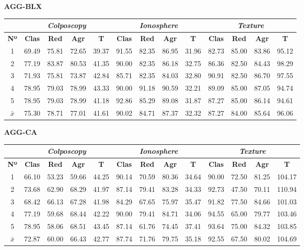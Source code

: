 \documentclass[12pt]{article}
\begin{document}
\textbf{AGG-BLX}

\begin{table}[ht!]
\begin{tabular}{ccccc|cccc|cccc}
\centering
 & \multicolumn{4}{c}{\textit{Colposcopy}} & \multicolumn{4}{c}{\textit{Ionosphere}} & \multicolumn{4}{c}{\textit{Texture}} \\ \hline
\textbf{Nº} & \textbf{Clas} & \textbf{Red} & \textbf{Agr} & \textbf{T} & \textbf{Clas} & \textbf{Red} & \textbf{Agr} & \textbf{T} & \textbf{Clas} & \textbf{Red} & \textbf{Agr} & \textbf{T} \\ \hline
1 & 69.49 & 75.81 & 72.65 & 39.37  & 91.55 & 82.35 & 86.95 & 31.96  & 82.73 & 85.00 & 83.86 & 95.12 \\
2 & 77.19 & 83.87 & 80.53 & 41.35  & 90.00 & 82.35 & 86.18 & 32.75  & 86.36 & 82.50 & 84.43 & 98.29 \\
3 & 71.93 & 75.81 & 73.87 & 42.84  & 85.71 & 82.35 & 84.03 & 32.80  & 90.91 & 82.50 & 86.70 & 97.55 \\
4 & 78.95 & 79.03 & 78.99 & 43.33  & 90.00 & 91.18 & 90.59 & 32.21  & 89.09 & 85.00 & 87.05 & 94.74 \\
5 & 78.95 & 79.03 & 78.99 & 41.18  & 92.86 & 85.29 & 89.08 & 31.87  & 87.27 & 85.00 & 86.14 & 94.61 \\
\hline
$\bar{x}$  & 75.30 & 78.71 & 77.01 & 41.61 & 90.02 & 84.71 & 87.37 & 32.32  & 87.27 & 84.00 & 85.64 & 96.06
\end{tabular}
\end{table}

\textbf{AGG-CA}

\begin{table}[ht!]
\begin{tabular}{ccccc|cccc|cccc}
\centering
 & \multicolumn{4}{c}{\textit{Colposcopy}} & \multicolumn{4}{c}{\textit{Ionosphere}} & \multicolumn{4}{c}{\textit{Texture}} \\ \hline
\textbf{Nº} & \textbf{Clas} & \textbf{Red} & \textbf{Agr} & \textbf{T} & \textbf{Clas} & \textbf{Red} & \textbf{Agr} & \textbf{T} & \textbf{Clas} & \textbf{Red} & \textbf{Agr} & \textbf{T} \\ \hline
1 & 66.10 & 53.23 & 59.66 & 44.25 & 90.14 & 70.59 & 80.36 & 34.64 & 90.00 & 72.50 & 81.25 & 104.17 \\
2 & 73.68 & 62.90 & 68.29 & 41.97 & 87.14 & 79.41 & 83.28 & 34.33 & 92.73 & 47.50 & 70.11 & 110.94 \\
3 & 68.42 & 66.13 & 67.28 & 41.98 & 84.29 & 67.65 & 75.97 & 35.47 & 91.82 & 77.50 & 84.66 & 101.03 \\
4 & 77.19 & 59.68 & 68.44 & 42.22 & 90.00 & 79.41 & 84.71 & 34.06 & 94.55 & 65.00 & 79.77 & 103.46 \\
5 & 78.95 & 58.06 & 68.51 & 43.45 & 87.14 & 61.76 & 74.45 & 37.41 & 93.64 & 75.00 & 84.32 & 103.85 \\
\hline
$\bar{x}$ & 72.87 & 60.00 & 66.43 & 42.77 & 87.74 & 71.76 & 79.75 & 35.18 & 92.55 & 67.50 & 80.02 & 104.69 \\
\end{tabular}
\end{table}
\newpage
\end{document}
